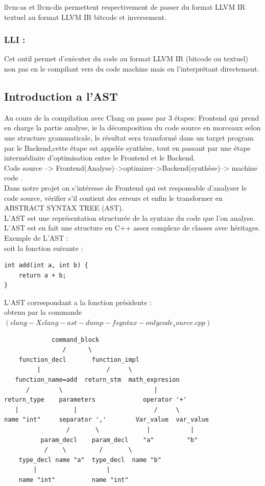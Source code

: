 \documentclass[12pt,titlepage]{article}
\begin{document}
    llvm-as et llvm-dis permettent respectivement de passer du format LLVM IR textuel au format LLVM IR bitcode et inversement.

    \subsubsection{ LLI : } 
    Cet outil permet d’exécuter du code au format LLVM IR (bitcode ou textuel) non pas en le compilant vers du code machine mais en l’interprétant directement.
    
\subsection{Introduction a l'AST}

Au cours de la compilation avec Clang on passe par 3 étapes: Frontend qui prend en charge la partie analyse, ie la décomposition du code source en morceaux selon une structure grammaticale, le résultat sera transformé  dans un target program par le Backend,cette étape est appelée synthèse, tout en passant par une étape intermédiaire d'optimisation entre le Frontend et le Backend.\\
Code source --> Frontend(Analyse)-->optimizer-->Backend(synthèse)--> machine code .\\
Dans notre projet on s’intéresse de Frontend qui est responsable d'analyser le code source, vérifier s'il contient des erreurs et enfin le transformer en ABSTRACT SYNTAX TREE (AST).\\
L'AST est une représentation structurée de la syntaxe du code que l'on analyse. \\
L'AST est en fait une structure en C++ assez complexe de classes avec héritages.\\
Exemple de L'AST :\\
soit la fonction  suivante :

\begin{lstlisting}
int add(int a, int b) {
    return a + b;
}
\end{lstlisting}

L'AST correspondant a la fonction présidente :\\
obtenu par la commande $(clang -Xclang -ast-dump -fsyntax-only code_source.cpp) $
\begin{lstlisting}
             command_block
                /      \
    function_decl       function_impl
         |                  /     \
   function_name=add  return_stm  math_expresion
      /        \                         |
return_type    parameters             operator '+'
   |               |                     /     \
name "int"     separator ','        Var_value  var_value
                 /       \             |           |
          param_decl    param_decl    "a"         "b"
           /    \         /       \
    type_decl name "a"  type_decl  name "b"
        |                   |
    name "int"          name "int"
\end{lstlisting}
\end{document}
